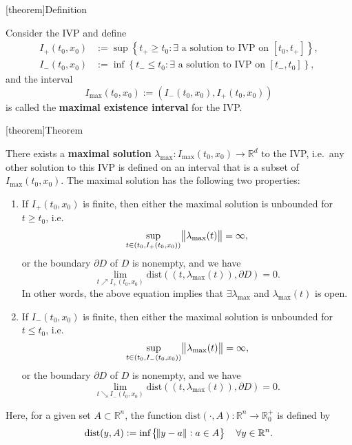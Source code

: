 \documentclass[12pt]{report}
\theoremstyle{definition}
\begin{document}
[theorem]{Definition}
\begin{maximal existence interval}
    Consider the IVP and define
    \begin{align*}
        I_+(t_0,x_0) & :=\sup\left\{t_+\ge t_0:\exists 
            \text{ a solution to IVP on }[t_0, t_+]\right\},\\
        I_-(t_0,x_0) & :=\inf\left\{t_-\le t_0:\exists 
            \text{ a solution to IVP on }[t_-, t_0]\right\},
    \end{align*} 
    and the interval
    \[
        I_{\text{max}}(t_0,x_0):=(I_-(t_0,x_0), I_+(t_0,x_0))
    \]
    is called the \textbf{maximal existence interval} for the IVP.
\end{maximal existence interval}

[theorem]{Theorem}
\begin{existence of the maximal solution and boundary behaviour}
    There exists a \textbf{maximal solution}
    $\lambda_{\text{max}}:I_{\text{max}}(t_0,x_0)\rightarrow\mathbb{R}^{d}$
    to the IVP, i.e.\ any other solution to this IVP is defined on an interval
    that is a subset of $I_{\text{max}}(t_0,x_0)$. The maximal solution has the
    following two properties:
    \begin{enumerate}[label = (\roman*)]
        \item If $I_+(t_0,x_0)$ is finite, then either the maximal solution is
            unbounded for $t\ge t_0$, i.e.\
            \[
                \underset{t\in(t_0,I_+(t_0,x_0))}{\sup}\norm{\lambda_{\text{max}}(t)}
                =\infty,
            \]
            or the boundary $\partial D$ of $D$ is nonempty, and we have
            \[
                \underset{t\nearrow I_+(t_0,x_0)}{\lim}\text{dist}
                \left((t,\lambda_{\text{max}}(t)), \partial D\right)=0.
            \]
            In other words, the above equation implies that
            $\exists \lambda_{\text{max}}$ and
            $\lambda_{\text{max}}(t)$ is open.
        \item If $I_-(t_0,x_0)$ is finite, then either the maximal solution is
            unbounded for $t\le t_0$, i.e.\
            \[
                \underset{t\in(t_0,I_-(t_0,x_0))}{\sup}\norm{\lambda_{\text{max}}(t)}
                =\infty,
            \]
            or the boundary $\partial D$ of $D$ is nonempty, and we have
            \[
                \underset{t\searrow I_-(t_0,x_0)}{\lim}\text{dist}
                \left((t,\lambda_{\text{max}}(t)), \partial D\right)=0.
            \]
    \end{enumerate} 
    Here, for a given set $A\subset \mathbb{R}^{n}$, the function 
    $\text{dist}(\cdot,A):\mathbb{R}^{n}\rightarrow\mathbb{R}_0^{+}$
    is defined by
    \[
        \text{dist}(y,A):=\text{inf}\left\{\norm{y-a}:a\in A\right\}
        \quad\forall y\in\mathbb{R}^{n}.
    \]
\end{existence of the maximal solution and boundary behaviour}
\end{document}
